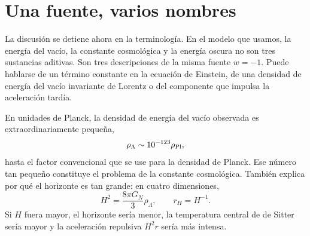 \section{Una fuente, varios nombres}

La discusión se detiene ahora en la terminología. En el modelo que usamos, la energía del vacío, la constante cosmológica y la energía oscura no son tres sustancias aditivas. Son tres descripciones de la misma fuente \(w=-1\). Puede hablarse de un término constante en la ecuación de Einstein, de una densidad de energía del vacío invariante de Lorentz o del componente que impulsa la aceleración tardía.

\begin{classroomqa}
\end{classroomqa}

\begin{classroomqa}
\end{classroomqa}

En unidades de Planck, la densidad de energía del vacío observada es extraordinariamente pequeña,
\begin{equation}
\rho_\Lambda\sim10^{-123}\rho_{\rm Pl},
\label{eq:l09-planck-smallness}
\end{equation}
hasta el factor convencional que se use para la densidad de Planck. Ese número tan pequeño constituye el problema de la constante cosmológica. También explica por qué el horizonte es tan grande: en cuatro dimensiones,
\begin{equation}
H^2=\frac{8\pi G_N}{3}\rho_\Lambda,
\qquad
r_H=H^{-1}.
\end{equation}
Si \(H\) fuera mayor, el horizonte sería menor, la temperatura central de de Sitter sería mayor y la aceleración repulsiva \(H^2r\) sería más intensa.

